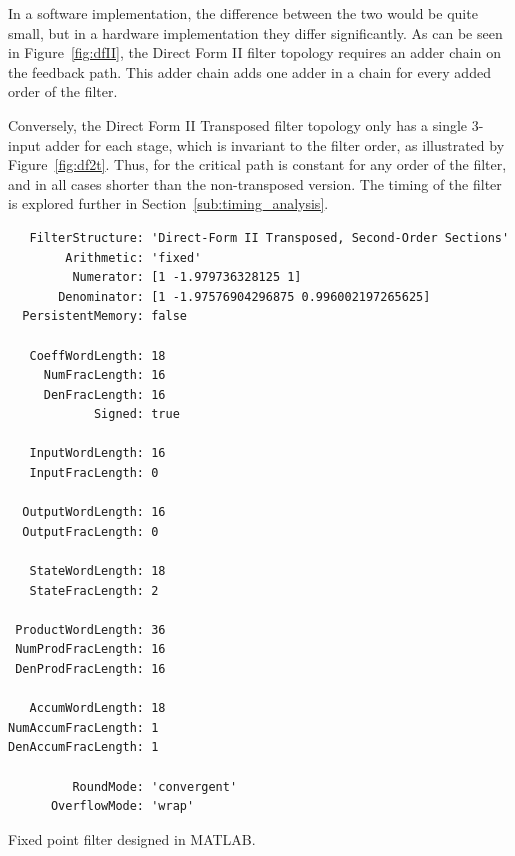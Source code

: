 \documentclass[]{article}
\begin{document}
In a software implementation, the difference between the two would be quite small, but in a hardware implementation they differ significantly. As can be seen in Figure~\ref{fig:dfII}, the Direct Form II filter topology requires an adder chain on the feedback path. This adder chain adds one adder in a chain for every added order of the filter.

Conversely, the Direct Form II Transposed filter topology only has a single 3-input adder for each stage, which is invariant to the filter order, as illustrated by Figure~\ref{fig:df2t}.
Thus, for the critical path is constant for any order of the filter, and in all cases shorter than the non-transposed version. The timing of the filter is explored further in Section~\ref{sub:timing_analysis}.


\begin{table}[htb]
	\begin{center}
		\begin{lstlisting}
   FilterStructure: 'Direct-Form II Transposed, Second-Order Sections'
        Arithmetic: 'fixed'
         Numerator: [1 -1.979736328125 1]                  
       Denominator: [1 -1.97576904296875 0.996002197265625]
  PersistentMemory: false

   CoeffWordLength: 18                
     NumFracLength: 16                
     DenFracLength: 16
            Signed: true              
                                      
   InputWordLength: 16                
   InputFracLength: 0                 
                                      
  OutputWordLength: 16
  OutputFracLength: 0                 
                                      
   StateWordLength: 18
   StateFracLength: 2                 
                                      
 ProductWordLength: 36                
 NumProdFracLength: 16                
 DenProdFracLength: 16                
                                      
   AccumWordLength: 18                
NumAccumFracLength: 1                 
DenAccumFracLength: 1                 

         RoundMode: 'convergent'      
      OverflowMode: 'wrap'  
		\end{lstlisting}
	\end{center}
	\caption{Fixed point filter designed in MATLAB.}
	\label{tab:Hdsdsos}
\end{table}
\end{document}
